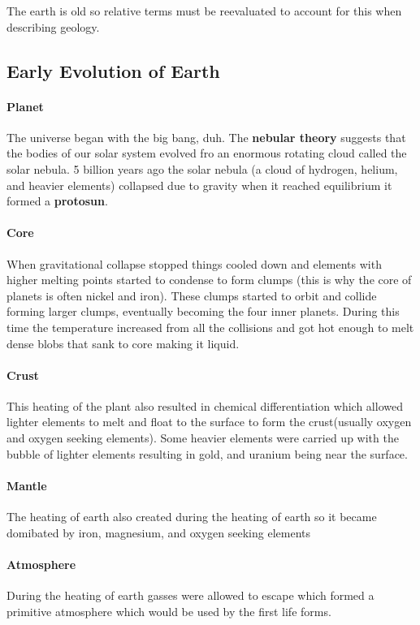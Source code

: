 \documentclass{article}
\begin{document}
The earth is old so relative terms must be reevaluated to account for this when describing geology.

\subsection{Early Evolution of Earth} %
\label{sub:early_evolution_of_earth}
 \paragraph{Planet}The universe began with the big bang, duh. The \textbf{nebular theory} suggests that the bodies of our solar system evolved fro an enormous rotating cloud called the solar nebula. 5 billion years ago the solar nebula (a cloud of hydrogen, helium, and heavier elements) collapsed due to gravity when it reached equilibrium it formed a \textbf{protosun}.

 \paragraph{Core} When gravitational collapse stopped things cooled down and elements with higher melting points started to condense to form clumps (this is why the core of planets is often nickel and iron). These clumps started to orbit and collide forming larger clumps, eventually becoming the four inner planets. During this time the temperature increased from all the collisions and got hot enough to melt dense blobs that sank to core making it liquid.

 \paragraph{Crust} This heating of the plant also resulted in chemical differentiation which allowed lighter elements to melt and float to the surface to form the crust(usually oxygen and oxygen seeking elements). Some heavier elements were carried up with the bubble of lighter elements resulting in gold, and uranium being near the surface.

\paragraph{Mantle} The heating of earth also created during the heating of earth so it became domibated by iron, magnesium, and oxygen seeking elements

\paragraph{Atmosphere} During the heating of earth gasses were allowed to escape which formed a primitive atmosphere which would be used by the first life forms.
\end{document}
